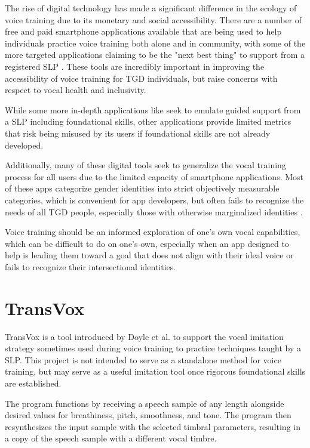 \documentclass{article}
\begin{document}
The rise of digital technology has made a significant difference in the ecology of voice training due to its monetary and social accessibility. There are a number of free and paid smartphone applications available that are being used to help individuals practice voice training both alone and in community, with some of the more targeted applications claiming to be the "next best thing" to support from a registered SLP \cite{devextras2018, nitzandseek2020, speechtools2013}. These tools are incredibly important in improving the accessibility of voice training for TGD individuals, but raise concerns with respect to vocal health and inclusivity.

While some more in-depth applications like \cite{speechtools2013} seek to emulate guided support from a SLP including foundational skills, other applications provide limited metrics \cite{devextras2018, nitzandseek2020} that risk being misused by its users if foundational skills are not already developed.

Additionally, many of these digital tools seek to generalize the vocal training process for all users due to the limited capacity of smartphone applications. Most of these apps categorize gender identities into strict objectively measurable categories, which is convenient for app developers, but often fails to recognize the needs of all TGD people, especially those with otherwise marginalized identities \cite{ahmed2022}.

Voice training should be an informed exploration of one's own vocal capabilities, which can be difficult to do on one's own, especially when an app designed to help is leading them toward a goal that does not align with their ideal voice or fails to recognize their intersectional identities.


\section{TransVox}\label{sec:page_size}

TransVox is a tool introduced by Doyle et al. \cite{doyle2025} to support the vocal imitation strategy sometimes used during voice training to practice techniques taught by a SLP. This project is not intended to serve as a standalone method for voice training, but may serve as a useful imitation tool once rigorous foundational skills are established.

The program functions by receiving a speech sample of any length alongside desired values for breathiness, pitch, smoothness, and tone. The program then resynthesizes the input sample with the selected timbral parameters, resulting in a copy of the speech sample with a different vocal timbre.
\end{document}

